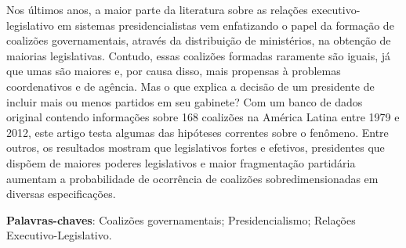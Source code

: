 \begin{resumo}
Nos últimos anos, a maior parte da literatura sobre as relações executivo-legislativo em sistemas presidencialistas vem enfatizando o papel da formação de coalizões governamentais, através da distribuição de ministérios, na obtenção de maiorias legislativas. Contudo, essas coalizões formadas raramente são iguais, já que umas são maiores e, por causa disso, mais propensas à problemas coordenativos e de agência. Mas o que explica a decisão de um presidente de incluir mais ou menos partidos em seu gabinete? Com um banco de dados original contendo informações sobre 168 coalizões na América Latina entre 1979 e 2012, este artigo testa algumas das hipóteses correntes sobre o fenômeno. Entre outros, os resultados mostram que legislativos fortes e efetivos, presidentes que dispõem de maiores poderes legislativos e maior fragmentação partidária aumentam a probabilidade de ocorrência de coalizões sobredimensionadas em diversas especificações.

\vspace{\onelineskip}
\noindent
\textbf{Palavras-chaves}: Coalizões governamentais;  Presidencialismo; Relações Executivo-Legislativo.
\end{resumo}